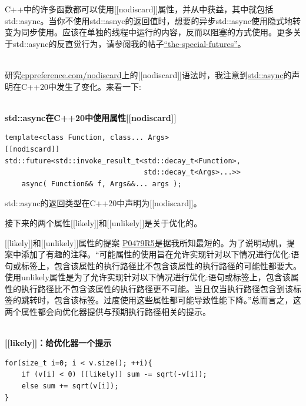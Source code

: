\begin{tcolorbox}[breakable,enhanced jigsaw,colback=red!5!white,colframe=red!75!black,title={std::async的问题}]
	
C++中的许多函数都可以使用[[nodiscard]]属性，并从中获益，其中就包括std::async。当你不使用std::asnyc的返回值时，想要的异步std::async使用隐式地转变为同步使用。应该在单独的线程中运行的内容，反而以阻塞的方式使用。更多关于std::async的反直觉行为，请参阅我的帖子\href{https://www.modernescpp.com/index.php/the-special-futures}{“the-special-futures”}。

\hspace*{\fill} \\ %
研究\href{https://en.cppreference.com/w/cpp/language/attributes/nodiscard}{cppreference.com/nodiscard}上的[[nodiscard]]语法时，我注意到\href{https://en.cppreference.com/w/cpp/thread/async}{std::async}的声明在C++20中发生了变化。来看一下:

\hspace*{\fill} \\ %
\noindent
\textbf{std::async在C++20中使用属性[[nodiscard]]}
\begin{lstlisting}[style=styleCXX]
template<class Function, class... Args>
[[nodiscard]]
std::future<std::invoke_result_t<std::decay_t<Function>,
								 std::decay_t<Args>...>>
	async( Function&& f, Args&&... args );
\end{lstlisting}

std::async的返回类型在C++20中声明为[[nodiscard]]。
	
\end{tcolorbox}

接下来的两个属性[[likely]]和[[unlikely]]是关于优化的。


[[likely]]和[[unlikely]]属性的提案 \href{http://www.open-std.org/jtc1/sc22/wg21/docs/papers/2018/p0479r5.html}{P0479R5}是据我所知最短的。为了说明动机，提案中添加了有趣的注释。“可能属性的使用旨在允许实现针对以下情况进行优化:语句或标签上，包含该属性的执行路径比不包含该属性的执行路径的可能性都要大。使用unlikely属性是为了允许实现针对以下情况进行优化:语句或标签上，包含该属性的执行路径比不包含该属性的执行路径更不可能。当且仅当执行路径包含到该标签的跳转时，包含该标签。过度使用这些属性都可能导致性能下降。”总而言之，这两个属性都会向优化器提供与预期执行路径相关的提示。

\hspace*{\fill} \\ %
\noindent
\textbf{[[likely]]：给优化器一个提示}
\begin{lstlisting}[style=styleCXX]
for(size_t i=0; i < v.size(); ++i){
	if (v[i] < 0) [[likely]] sum -= sqrt(-v[i]);
	else sum += sqrt(v[i]);
}
\end{lstlisting}

